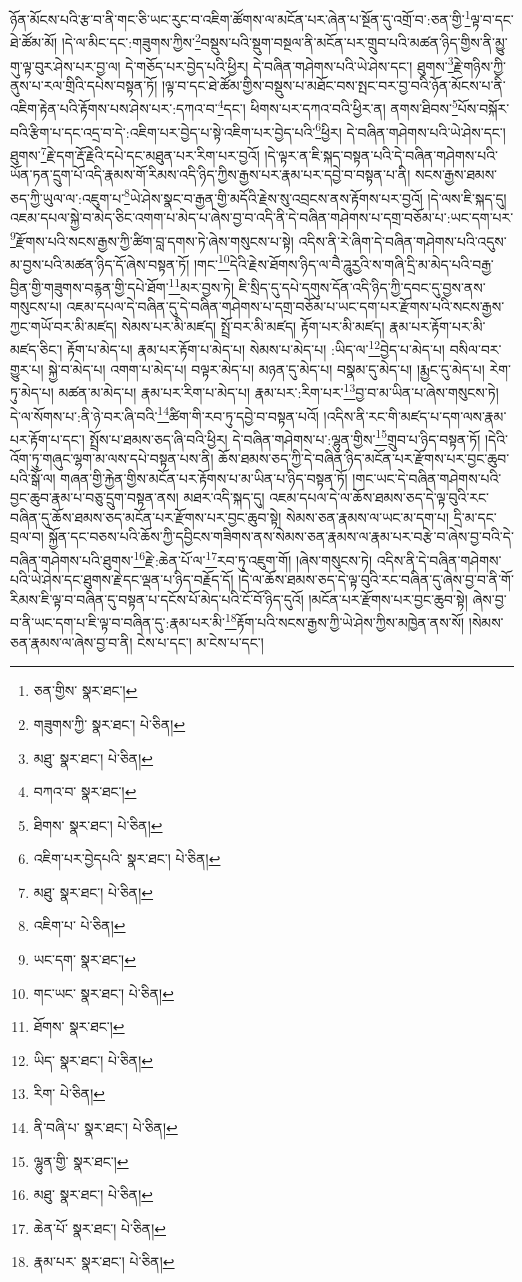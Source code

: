 ཉོན་མོངས་པའི་རྩ་བ་ནི་གང་ཅི་ཡང་རུང་བ་འཇིག་ཚོགས་ལ་མངོན་པར་ཞེན་པ་སྔོན་དུ་འགྲོ་བ་:ཅན་གྱི་\footnote{ཅན་གྱིས་  སྣར་ཐང་། }ལྟ་བ་དང་ཐེ་ཚོམ་མོ། །དེ་ལ་མིང་དང་:གཟུགས་ཀྱིས་\footnote{གཟུགས་ཀྱི་  སྣར་ཐང་།  པེ་ཅིན། }བསྡུས་པའི་སྡུག་བསྔལ་ནི་མངོན་པར་གྲུབ་པའི་མཚན་ཉིད་གྱིས་ནི་མྱུ་གུ་ལྟ་བུར་ཤེས་པར་བྱ་ལ། དེ་གཅོད་པར་བྱེད་པའི་ཕྱིར། དེ་བཞིན་གཤེགས་པའི་ཡེ་ཤེས་དང་། ཐུགས་\footnote{མཐུ་  སྣར་ཐང་།  པེ་ཅིན། }རྗེ་གཉིས་ཀྱི་ནུས་པ་རལ་གྲིའི་དཔེས་བསྟན་ཏོ། །ལྟ་བ་དང་ཐེ་ཚོམ་གྱིས་བསྡུས་པ་མཐོང་བས་སྤང་བར་བྱ་བའི་ཉོན་མོངས་པ་ནི་འཇིག་རྟེན་པའི་རྟོགས་པས་ཤེས་པར་:དཀའ་བ་\footnote{བཀའ་བ་  སྣར་ཐང་། }དང་། ཕིགས་པར་དཀའ་བའི་ཕྱིར་ན། ནགས་ཐིབས་\footnote{ཐིགས་  སྣར་ཐང་།  པེ་ཅིན། }པོས་བསྐོར་བའི་རྩིག་པ་དང་འདྲ་བ་དེ་:འཇིག་པར་བྱེད་པ་སྟེ་འཇིག་པར་བྱེད་པའི་\footnote{འཇིག་པར་བྱེདཔའི་  སྣར་ཐང་།  པེ་ཅིན། }ཕྱིར། དེ་བཞིན་གཤེགས་པའི་ཡེ་ཤེས་དང་། ཐུགས་\footnote{མཐུ་  སྣར་ཐང་།  པེ་ཅིན། }རྗེ་དག་རྡོ་རྗེའི་དཔེ་དང་མཐུན་པར་རིག་པར་བྱའོ། །དེ་ལྟར་ན་ཇི་སྐད་བསྟན་པའི་དེ་བཞིན་གཤེགས་པའི་ཡོན་ཏན་དྲུག་པོ་འདི་རྣམས་གོ་རིམས་འདི་ཉིད་ཀྱིས་རྒྱས་པར་རྣམ་པར་དབྱེ་བ་བསྟན་པ་ནི། སངས་རྒྱས་ཐམས་ཅད་ཀྱི་ཡུལ་ལ་:འཇུག་པ་\footnote{འཇིག་པ་  པེ་ཅིན། }ཡེ་ཤེས་སྣང་བ་རྒྱན་གྱི་མདོའི་རྗེས་སུ་འབྲངས་ནས་རྟོགས་པར་བྱའོ། །དེ་ལས་ཇི་སྐད་དུ། འཇམ་དཔལ་སྐྱེ་བ་མེད་ཅིང་འགག་པ་མེད་པ་ཞེས་བྱ་བ་འདི་ནི་དེ་བཞིན་གཤེགས་པ་དགྲ་བཅོམ་པ་:ཡང་དག་པར་\footnote{ཡང་དག་  སྣར་ཐང་། }རྫོགས་པའི་སངས་རྒྱས་ཀྱི་ཚིག་བླ་དགས་ཏེ་ཞེས་གསུངས་པ་སྟེ། འདིས་ནི་རེ་ཞིག་དེ་བཞིན་གཤེགས་པའི་འདུས་མ་བྱས་པའི་མཚན་ཉིད་དོ་ཞེས་བསྟན་ཏོ། །གང་\footnote{གང་ཡང་  སྣར་ཐང་།  པེ་ཅིན། }དེའི་རྗེས་ཐོགས་ཉིད་ལ་བཻ་ཌཱུརྱའི་ས་གཞི་དྲི་མ་མེད་པའི་བརྒྱ་བྱིན་གྱི་གཟུགས་བརྙན་གྱི་དཔེ་ཐོག་\footnote{ཐོགས་  སྣར་ཐང་། }མར་བྱས་ཏེ། ཇི་སྲིད་དུ་དཔེ་དགུས་དོན་འདི་ཉིད་ཀྱི་དབང་དུ་བྱས་ནས་གསུངས་པ། འཇམ་དཔལ་དེ་བཞིན་དུ་དེ་བཞིན་གཤེགས་པ་དགྲ་བཅོམ་པ་ཡང་དག་པར་རྫོགས་པའི་སངས་རྒྱས་ཀྱང་གཡོ་བར་མི་མཛད། སེམས་པར་མི་མཛད། སྤྲོ་བར་མི་མཛད། རྟོག་པར་མི་མཛད། རྣམ་པར་རྟོག་པར་མི་མཛད་ཅིང་། རྟོག་པ་མེད་པ། རྣམ་པར་རྟོག་པ་མེད་པ། སེམས་པ་མེད་པ། :ཡིད་ལ་\footnote{ཡིད་  སྣར་ཐང་།  པེ་ཅིན། }བྱེད་པ་མེད་པ། བསིལ་བར་གྱུར་པ། སྐྱེ་བ་མེད་པ། འགག་པ་མེད་པ། བལྟར་མེད་པ། མཉན་དུ་མེད་པ། བསྣམ་དུ་མེད་པ། །རྨྱང་དུ་མེད་པ། རེག་ཏུ་མེད་པ། མཚན་མ་མེད་པ། རྣམ་པར་རིག་པ་མེད་པ། རྣམ་པར་:རིག་པར་\footnote{རིག་  པེ་ཅིན། }བྱ་བ་མ་ཡིན་པ་ཞེས་གསུངས་ཏེ། དེ་ལ་སོགས་པ་:ནི་ཉེ་བར་ཞི་བའི་\footnote{ནི་བཞི་པ་  སྣར་ཐང་།  པེ་ཅིན། }ཚིག་གི་རབ་ཏུ་དབྱེ་བ་བསྟན་པའོ། །འདིས་ནི་རང་གི་མཛད་པ་དག་ལས་རྣམ་པར་རྟོག་པ་དང་། སྤྲོས་པ་ཐམས་ཅད་ཞི་བའི་ཕྱིར། དེ་བཞིན་གཤེགས་པ་:ལྷུན་གྱིས་\footnote{ལྷུན་གྱི་  སྣར་ཐང་། }གྲུབ་པ་ཉིད་བསྟན་ཏོ། །དེའི་འོག་ཏུ་གཞུང་ལྷག་མ་ལས་དཔེ་བསྟན་པས་ནི། ཆོས་ཐམས་ཅད་ཀྱི་དེ་བཞིན་ཉིད་མངོན་པར་རྫོགས་པར་བྱང་ཆུབ་པའི་སྒོ་ལ། གཞན་གྱི་རྐྱེན་གྱིས་མངོན་པར་རྟོགས་པ་མ་ཡིན་པ་ཉིད་བསྟན་ཏོ། །གང་ཡང་དེ་བཞིན་གཤེགས་པའི་བྱང་ཆུབ་རྣམ་པ་བཅུ་དྲུག་བསྟན་ནས། མཐར་འདི་སྐད་དུ། འཇམ་དཔལ་དེ་ལ་ཆོས་ཐམས་ཅད་དེ་ལྟ་བུའི་རང་བཞིན་དུ་ཆོས་ཐམས་ཅད་མངོན་པར་རྫོགས་པར་བྱང་ཆུབ་སྟེ། སེམས་ཅན་རྣམས་ལ་ཡང་མ་དག་པ། དྲི་མ་དང་བྲལ་བ། སྐྱོན་དང་བཅས་པའི་ཆོས་ཀྱི་དབྱིངས་གཟིགས་ནས་སེམས་ཅན་རྣམས་ལ་རྣམ་པར་བརྩེ་བ་ཞེས་བྱ་བའི་དེ་བཞིན་གཤེགས་པའི་ཐུགས་\footnote{མཐུ་  སྣར་ཐང་།  པེ་ཅིན། }རྗེ་:ཆེན་པོ་ལ་\footnote{ཆེན་པོ་  སྣར་ཐང་།  པེ་ཅིན། }རབ་ཏུ་འཇུག་གོ། །ཞེས་གསུངས་ཏེ། འདིས་ནི་དེ་བཞིན་གཤེགས་པའི་ཡེ་ཤེས་དང་ཐུགས་རྗེ་དང་ལྡན་པ་ཉིད་བརྗོད་དོ། །དེ་ལ་ཆོས་ཐམས་ཅད་དེ་ལྟ་བུའི་རང་བཞིན་དུ་ཞེས་བྱ་བ་ནི་གོ་རིམས་ཇི་ལྟ་བ་བཞིན་དུ་བསྟན་པ་དངོས་པོ་མེད་པའི་ངོ་བོ་ཉིད་དུའོ། །མངོན་པར་རྫོགས་པར་བྱང་ཆུབ་སྟེ། ཞེས་བྱ་བ་ནི་ཡང་དག་པ་ཇི་ལྟ་བ་བཞིན་དུ་:རྣམ་པར་མི་\footnote{རྣམ་པར་  སྣར་ཐང་།  པེ་ཅིན། }རྟོག་པའི་སངས་རྒྱས་ཀྱི་ཡེ་ཤེས་ཀྱིས་མཁྱེན་ནས་སོ། །སེམས་ཅན་རྣམས་ལ་ཞེས་བྱ་བ་ནི། ངེས་པ་དང་། མ་ངེས་པ་དང་། 